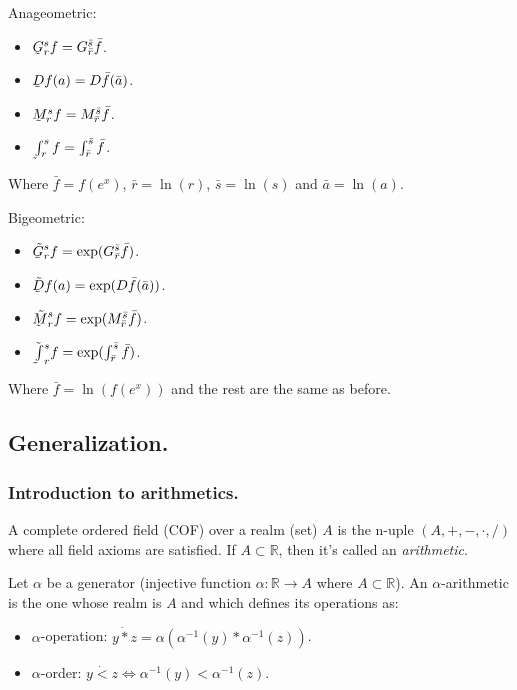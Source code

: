 Anageometric:

\begin{itemize}
	\item $\underaccent{\tilde}{G}_r^s f = G_{\bar{r}}^{\bar{s}} \bar{f}$.
	\item $\underaccent{\tilde}{D}f(a) = D\bar{f}(\bar{a})$.
	\item $\underaccent{\tilde}{M}_r^sf = M_{\bar{r}}^{\bar{s}} \bar{f}$.
	\item $\underaccent{\tilde}{\int}_r^s f = \int_{\bar{r}}^{\bar{s}} \bar{f}$.
\end{itemize}

Where $\bar{f} = f(e^x)$, $\bar{r} = \ln(r)$, $\bar{s} = \ln(s)$ and $\bar{a} = \ln(a)$.

Bigeometric:

\begin{itemize}
	\item $\tilde{\underaccent{\tilde}{G}}_r^s f = \exp(G_{\bar{r}}^{\bar{s}} \bar{f})$.
	\item $\tilde{\underaccent{\tilde}{D}}f(a) = \exp(D\bar{f}(\bar{a}))$.
	\item $\tilde{\underaccent{\tilde}{M}}_r^s f = \exp(M_{\bar{r}}^{\bar{s}} \bar{f})$.
	\item $\tilde{\underaccent{\tilde}{\int}}_r^s f = \exp(\int_{\bar{r}}^{\bar{s}} \bar{f})$.
\end{itemize}

Where $\bar{f} = \ln(f(e^x))$ and the rest are the same as before.

\subsection{Generalization.} \label{general}

\subsubsection{Introduction to arithmetics.}

A complete ordered field (COF) over a realm (set) $A$ is the n-uple $(A, +, -, \cdot, /)$ where all field axioms are satisfied. If $A \subset \mathbb{R}$, then it's called an \textit{arithmetic}.

Let $\alpha$ be a generator (injective function $\alpha: \mathbb{R} \to A$ where $A \subset \mathbb{R}$). An $\alpha$-arithmetic is the one whose realm is $A$ and which defines its operations as:

\begin{itemize}
	\item $\alpha$-operation: $y \dot{*} z = \alpha(\alpha^{-1}(y) * \alpha^{-1}(z))$.
	\item $\alpha$-order: $y \dot{<} z \iff \alpha^{-1}(y) < \alpha^{-1}(z)$.
\end{itemize}

